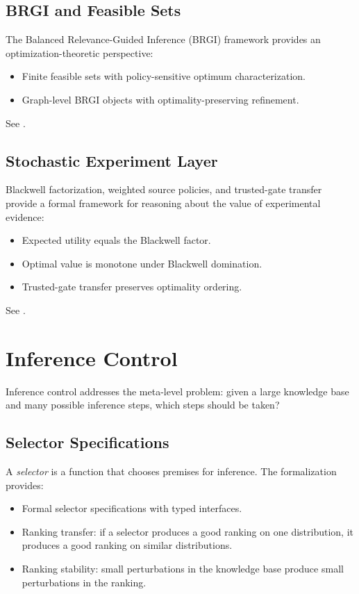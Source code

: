 \documentclass[11pt,openany]{report}
\begin{document}
\section{BRGI and Feasible Sets}

The Balanced Relevance-Guided Inference (BRGI) framework provides an
optimization-theoretic perspective:
\begin{itemize}
\item Finite feasible sets with policy-sensitive optimum characterization.
\item Graph-level BRGI objects with optimality-preserving refinement.
\end{itemize}

See .

\section{Stochastic Experiment Layer}

Blackwell factorization, weighted source policies, and trusted-gate
transfer provide a formal framework for reasoning about the value of
experimental evidence:
\begin{itemize}
\item Expected utility equals the Blackwell factor.
\item Optimal value is monotone under Blackwell domination.
\item Trusted-gate transfer preserves optimality ordering.
\end{itemize}

See .


\chapter{Inference Control}
\label{ch:inference-control}

Inference control addresses the meta-level problem: given a large knowledge
base and many possible inference steps, which steps should be taken?

\section{Selector Specifications}

A \emph{selector} is a function that chooses premises for inference.
The formalization provides:
\begin{itemize}
\item Formal selector specifications with typed interfaces.
\item Ranking transfer: if a selector produces a good ranking on one
  distribution, it produces a good ranking on similar distributions.
\item Ranking stability: small perturbations in the knowledge base
  produce small perturbations in the ranking.
\end{itemize}
\end{document}
